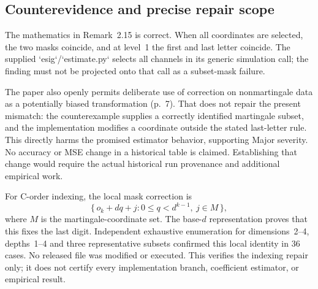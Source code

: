 \documentclass[10pt]{article}
\begin{document}
\subsection*{Counterevidence and precise repair scope}
The mathematics in Remark 2.15 is correct. When all coordinates are selected, the two masks coincide, and at level 1 the first and last letter coincide. The supplied `esig`/`estimate.py` selects all channels in its generic simulation call; the finding must not be projected onto that call as a subset-mask failure.\par
The paper also openly permits deliberate use of correction on nonmartingale data as a potentially biased transformation (p. 7). That does not repair the present mismatch: the counterexample supplies a correctly identified martingale subset, and the implementation modifies a coordinate outside the stated last-letter rule. This directly harms the promised estimator behavior, supporting Major severity. No accuracy or MSE change in a historical table is claimed. Establishing that change would require the actual historical run provenance and additional empirical work.\par
For C-order indexing, the local mask correction is \[\{\,o_k+dq+j:
       0\le q<d^{k-1},\ j\in M\,\},\] where \(M\) is the martingale-coordinate set. The base-\(d\) representation proves that this fixes the last digit. Independent exhaustive enumeration for dimensions 2–4, depths 1–4 and three representative subsets confirmed this local identity in 36 cases. No released file was modified or executed. This verifies the indexing repair only; it does not certify every implementation branch, coefficient estimator, or empirical result.\par
\end{document}
